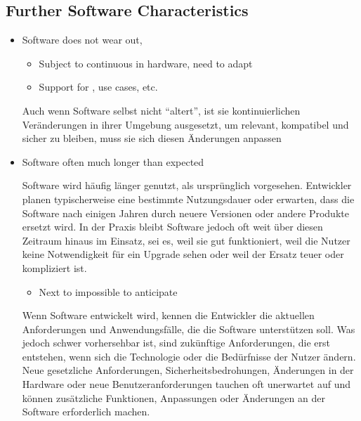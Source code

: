 \subsection{Further Software Characteristics}
\begin{itemize}
    \item Software does not wear out, 
    \begin{itemize}
        \item Subject to continuous  in hardware, need to adapt
        \item Support for , use cases, etc.
    \end{itemize}
    \begin{infoBox}
        Auch wenn Software selbst nicht \enquote{altert}, ist sie kontinuierlichen Veränderungen in ihrer Umgebung ausgesetzt, um relevant, kompatibel und sicher zu bleiben, muss sie sich diesen Änderungen anpassen
    \end{infoBox}
    \item Software  often much longer than expected
    \begin{infoBox}
        Software wird häufig länger genutzt, als ursprünglich vorgesehen. Entwickler planen typischerweise eine bestimmte Nutzungsdauer oder erwarten, dass die Software nach einigen Jahren durch neuere Versionen oder andere Produkte ersetzt wird. In der Praxis bleibt Software jedoch oft weit über diesen Zeitraum hinaus im Einsatz, sei es, weil sie gut funktioniert, weil die Nutzer keine Notwendigkeit für ein Upgrade sehen oder weil der Ersatz teuer oder kompliziert ist.
    \end{infoBox}
    \begin{itemize}
        \item Next to impossible to anticipate 
    \end{itemize}
     \begin{infoBox}
         Wenn Software entwickelt wird, kennen die Entwickler die aktuellen Anforderungen und Anwendungsfälle, die die Software unterstützen soll. Was jedoch schwer vorhersehbar ist, sind zukünftige Anforderungen, die erst entstehen, wenn sich die Technologie oder die Bedürfnisse der Nutzer ändern. Neue gesetzliche Anforderungen, Sicherheitsbedrohungen, Änderungen in der Hardware oder neue Benutzeranforderungen tauchen oft unerwartet auf und können zusätzliche Funktionen, Anpassungen oder Änderungen an der Software erforderlich machen.
     \end{infoBox}

\end{itemize}
